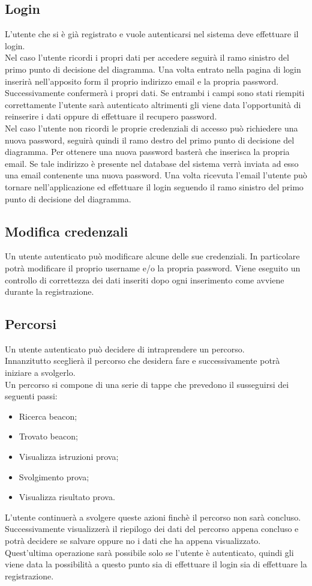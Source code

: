 \subsection{Login}
L'utente che si è già registrato e vuole autenticarsi nel sistema deve effettuare il login. \\
Nel caso l'utente ricordi i propri dati per accedere seguirà il ramo sinistro del primo punto di decisione del diagramma. Una volta entrato nella pagina di login inserirà nell'apposito form il proprio indirizzo email e la propria password. Successivamente confermerà i propri dati. Se entrambi i campi sono stati riempiti correttamente l'utente sarà autenticato altrimenti gli viene data l'opportunità di reinserire i dati oppure di effettuare il recupero password. \\
Nel caso l'utente non ricordi le proprie credenziali di accesso può richiedere una nuova password, seguirà quindi il ramo destro del primo punto di decisione del diagramma. Per ottenere una nuova password basterà che inserisca la propria email. Se tale indirizzo è presente nel database del sistema verrà inviata ad esso una email contenente una nuova password. Una volta ricevuta l'email l'utente può tornare nell'applicazione ed effettuare il login seguendo il ramo sinistro del primo punto di decisione del diagramma.

\subsection{Modifica credenzali}
Un utente autenticato può modificare alcune delle sue credenziali. In particolare potrà modificare il proprio username e/o la propria password.
Viene eseguito un controllo di correttezza dei dati inseriti dopo ogni inserimento come avviene durante la registrazione.

\subsection{Percorsi}
Un utente autenticato può decidere di intraprendere un percorso. \\ 
Innanzitutto sceglierà il percorso che desidera fare e successivamente potrà iniziare a svolgerlo. \\ Un percorso si compone di una serie di tappe che prevedono il susseguirsi dei seguenti passi:
\begin{itemize}
	\item Ricerca beacon;
	\item Trovato beacon;
	\item Visualizza istruzioni prova;
	\item Svolgimento prova;
	\item Visualizza risultato prova.
\end{itemize}
L'utente continuerà a svolgere queste azioni finchè il percorso non sarà concluso. Successivamente visualizzerà il riepilogo dei dati del percorso appena concluso e potrà decidere se salvare oppure no i dati che ha appena visualizzato. Quest'ultima operazione sarà possibile solo se l'utente è autenticato, quindi gli viene data la possibilità a questo punto sia di effettuare il login sia di effettuare la registrazione.

